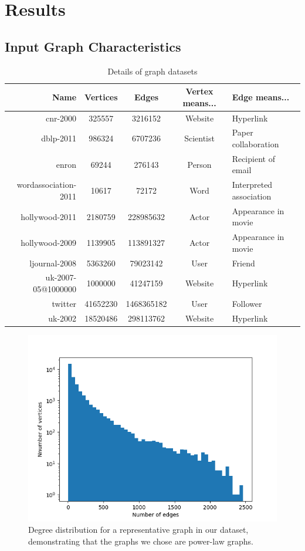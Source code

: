 \section{Results}
\label{sec:eval}

\subsection{Input Graph Characteristics}

\begin{table}[t]
	\centering
	\begin{tabular}{r|cccl}
		\textbf{Name} & \textbf{Vertices} & \textbf{Edges} & \textbf{Vertex 
			means...} & \textbf{Edge means...}\\
		\hline
		cnr-2000 & 325557 & 3216152 & Website & Hyperlink\\
		dblp-2011 & 986324 & 6707236 & Scientist & Paper collaboration \\
		enron & 69244 & 276143 & Person & Recipient of email\\
		wordassociation-2011 & 10617 & 72172 & Word & Interpreted association \\
		hollywood-2011 & 2180759 & 228985632 & Actor & Appearance in movie\\
		hollywood-2009 & 1139905 & 113891327 & Actor & Appearance in movie\\
		ljournal-2008 & 5363260 & 79023142 & User & Friend\\
		uk-2007-05@1000000 & 1000000 & 41247159 & Website & Hyperlink\\
		twitter & 41652230 & 1468365182 & User & Follower\\
		uk-2002 & 18520486 & 298113762 & Website & Hyperlink\\
	\end{tabular}
	\caption{Details of graph datasets}
	\label{tab:graph_types}
\end{table}

\begin{figure}
	\centering
	\includegraphics[width=\columnwidth]{../good_plots/degree_distribution_10_mil.png}
	\caption{Degree distribution for a representative graph in our dataset, 
		demonstrating that the graphs we chose are power-law graphs.}
	\label{fig:degree_distribution}
\end{figure}

